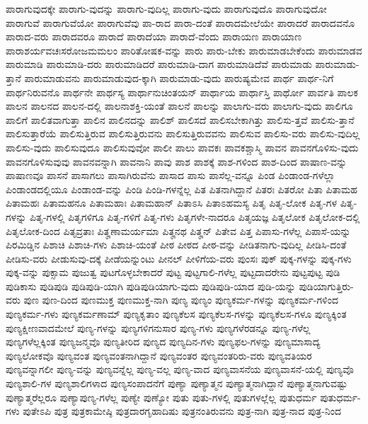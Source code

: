 {ಪಾರಾಗುವುದಕ್ಕೇ
ಪಾರಾಗು-ವುದನ್ನು
ಪಾರಾಗು-ವುದಿಲ್ಲ
ಪಾರಾಗು-ವುದು
ಪಾರಾಗುವುದೊ
ಪಾರಾಗುವುದೋ
ಪಾರಾಗುವೆ
ಪಾರಾಗುವೆಯೋ
ಪಾರಾಗುವೆವು
ಪಾ-ರಾದ
ಪಾರಾ-ದಂತೆ
ಪಾರಾದಮೇಲೆಯೇ
ಪಾರಾದರೆ
ಪಾರಾದವನೊ
ಪಾರಾದ-ವರು
ಪಾರಾದವರೂ
ಪಾರಾದೆ
ಪಾರಾದೆಯಾ
ಪಾರಾದೆ-ವೆಂದು
ಪಾರಾಯಣ
ಪಾರಾಯಾಣ
ಪಾರಾಶರ್ಯವಚಃಸರೋಜಮಮಲಂ
ಪಾರಿತೋಷಕ-ವನ್ನು
ಪಾರು
ಪಾರು-ಬೇಕು
ಪಾರುಮಾಡಬೇಕೆಂದು
ಪಾರುಮಾಡವ
ಪಾರುಮಾಡಿ
ಪಾರುಮಾಡಿ-ದರು
ಪಾರುಮಾಡಿದರೆ
ಪಾರುಮಾಡಿ-ದಾಗ
ಪಾರುಮಾಡಿದೆವೆ
ಪಾರುಮಾಡು
ಪಾರುಮಾಡು-ತ್ತಾನೆ
ಪಾರುಮಾಡುವನು
ಪಾರುಮಾಡುವುದ-ಕ್ಕಾಗಿ
ಪಾರುಮಾಡು-ವುದು
ಪಾರುಷ್ಯಮೇವ
ಪಾರ್ಥ
ಪಾರ್ಥ-ನಿಗೆ
ಪಾರ್ಥನಿರುವನೊ
ಪಾರ್ಥನೇ
ಪಾರ್ಥಸ್ಯ
ಪಾರ್ಥಾನುಚಿಂತಯನ್
ಪಾರ್ಥಾಯ
ಪಾರ್ಥಾಸ್ತಿ
ಪಾರ್ಥೋ
ಪಾರ್ವತಿ
ಪಾಲಕ
ಪಾಲನ
ಪಾಲನದ
ಪಾಲನ-ದಲ್ಲಿ
ಪಾಲನಾಶಕ್ತಿ-ಯಂತೆ
ಪಾಲನೆ
ಪಾಲನ್ನು
ಪಾಲಾಗು-ವರು
ಪಾಲಾಗು-ವುದು
ಪಾಲಿಗೂ
ಪಾಲಿಗೆ
ಪಾಲಿತವಾಗುತ್ತಾ
ಪಾಲಿನ
ಪಾಲಿನದನ್ನು
ಪಾಲಿಶ್
ಪಾಲಿಸದೆ
ಪಾಲಿಸಬೇಕಾಗಿತ್ತು
ಪಾಲಿಸು-ತ್ತವೆ
ಪಾಲಿಸು-ತ್ತಾನೆ
ಪಾಲಿಸುತ್ತಾರೆಯೆ
ಪಾಲಿಸುತ್ತಿರುವ
ಪಾಲಿಸುತ್ತಿರುವನು
ಪಾಲಿಸುತ್ತಿರುವವನು
ಪಾಲಿಸುವ
ಪಾಲಿಸು-ವರು
ಪಾಲಿಸು-ವುದಿಲ್ಲ
ಪಾಲಿಸು-ವುದು
ಪಾಲಿಸುವುದೂ
ಪಾಲಿಸುವುವೋ
ಪಾಲೀ
ಪಾಲು
ಪಾವಕಃ
ಪಾವಕಶ್ಚಾಸ್ಮಿ
ಪಾವನ
ಪಾವನಗೊಳಿಸು-ವುದು
ಪಾವನಗೊಳಿಸುವುವು
ಪಾವನವನ್ನಾಗಿ
ಪಾವನಾನಿ
ಪಾವು
ಪಾಶ
ಪಾಶಕ್ಕೆ
ಪಾಶ-ಗಳಿಂದ
ಪಾಶ-ದಿಂದ
ಪಾಷಾಣ-ವನ್ನು
ಪಾಷಾಣವೂ
ಪಾಸನೆ
ಪಾಸಾಗಲು
ಪಾಸಾಗಿರುವೆನು
ಪಾಸಾದ
ಪಾಸು
ಪಾಸೆಲ್ಲ-ವನ್ನೂ
ಪಿಂಡ
ಪಿಂಡಾಂಡ-ಗಳೆಲ್ಲಾ
ಪಿಂಡಾಂಡದಲ್ಲಿಯೂ
ಪಿಂಡಾಂಡ-ವನ್ನು
ಪಿಂಡಿ
ಪಿಂಡಿ-ಗಳನ್ನೆಲ್ಲ
ಪಿತ
ಪಿತನಾಗಿದ್ದಾನೆ
ಪಿತರಃ
ಪಿತರೋ
ಪಿತಾ
ಪಿತಾಮಹ
ಪಿತಾಮಹಃ
ಪಿತಾಮಹನೂ
ಪಿತಾಮಹಾಃ
ಪಿತಾಮಹಾನ್
ಪಿತಾಽಸಿ
ಪಿತಾಽಹಮಸ್ಯ
ಪಿತೃ
ಪಿತೃ-ಲೋಕ
ಪಿತೃ-ಗಳ
ಪಿತೃ-ಗಳನ್ನು
ಪಿತೃ-ಗಳಲ್ಲಿ
ಪಿತೃಗಳಿಗೂ
ಪಿತೃ-ಗಳಿಗೆ
ಪಿತೃ-ಗಳು
ಪಿತೃಗಳೇ-ನಾದರೂ
ಪಿತೃಯಜ್ಞ
ಪಿತೃಲೋಕ
ಪಿತೃಲೋಕ-ದಲ್ಲಿ
ಪಿತೃಲೋಕ-ದಿಂದ
ಪಿತೃವ್ರತಾಃ
ಪಿತೄಣಾಮರ್ಯಮಾ
ಪಿತೄನಥ
ಪಿತೄನ್
ಪಿತೇವ
ಪಿತ್ತ
ಪಿಪಾಸು-ಗಳೆಲ್ಲ
ಪಿಪಾಸೆ-ಯನ್ನು
ಪಿರಮಿಡ್ಡಿನ
ಪಿಶಾಚಿ
ಪಿಶಾಚಿ-ಗಳು
ಪಿಶಾಚಿ-ಯಂತೆ
ಪೀಠ
ಪೀಠದ
ಪೀಠ-ವನ್ನು
ಪೀಡಿತನಾಗು-ವುದಿಲ್ಲ
ಪೀಡಿಸಿ-ದಂತೆ
ಪೀಡಿಸು-ವರು
ಪೀಡುಸುವು-ದಕ್ಕೆ
ಪೀಡೆಯನ್ನುಂಟು
ಪೀನಲ್
ಪೀಳಿಗೆಯ-ವರು
ಪುಂಸಃ
ಪುಕ್
ಪುಕ್ಕ-ಗಳನ್ನು
ಪುಕ್ಕ-ಗಳು
ಪುಕ್ಕ-ವನ್ನು
ಪುಕ್ಸಾಮ
ಪುಜುತ್ವ
ಪುಟಗೊಳ್ಳಬೇಕಾದರೆ
ಪುಟ್ಟ
ಪುಟ್ಟಗಾಲಿ-ಗಳೆಲ್ಲ
ಪುಟ್ಟದಾದರೇನು
ಪುಟ್ಟಪುಟ್ಟ
ಪುಡಿ
ಪುಡಿಕಾಸು
ಪುಡಿಪುಡಿ
ಪುಡಿಪುಡಿ-ಯಾಗಿ
ಪುಡಿಪುಡಿಯಾಗು-ವುದು
ಪುಡಿಪುಡಿ-ಯಾದ
ಪುಡಿ-ಯನ್ನು
ಪುಡಿಯಾಗುತ್ತಿರು-ವರು
ಪುಣ
ಪುಣ-ದಿಂದ
ಪುಣಮುಕ್ತ
ಪುಣಮುಕ್ತ-ನಾಗಿ
ಪುಣ್ಯ
ಪುಣ್ಯಂ
ಪುಣ್ಯಕರ್ಮ-ಗಳನ್ನು
ಪುಣ್ಯಕರ್ಮ-ಗಳಿಂದ
ಪುಣ್ಯಕರ್ಮ-ಗಳು
ಪುಣ್ಯಕರ್ಮಣಾಮ್
ಪುಣ್ಯಕೃತಾಂ
ಪುಣ್ಯಕೆಲಸ
ಪುಣ್ಯಕೆಲಸ-ಗಳನ್ನು
ಪುಣ್ಯಕೆಲಸ-ಗಳೂ
ಪುಣ್ಯಕ್ಕಿಂತ
ಪುಣ್ಯಕ್ಷೀಣವಾದಮೇಲೆ
ಪುಣ್ಯ-ಗಳನ್ನು
ಪುಣ್ಯಗಳಿಗನುಸಾರ
ಪುಣ್ಯ-ಗಳು
ಪುಣ್ಯಗಳೆರಡನ್ನೂ
ಪುಣ್ಯ-ಗಳೆಲ್ಲ
ಪುಣ್ಯಗಳೆಲ್ಲಕ್ಕಿಂತ
ಪುಣ್ಯಜನ್ಮವೊ
ಪುಣ್ಯತೀರಿದ
ಪುಣ್ಯದ
ಪುಣ್ಯದಿನ-ಗಳು
ಪುಣ್ಯಫಲ-ಗಳನ್ನು
ಪುಣ್ಯಮಾಸಾದ್ಯ
ಪುಣ್ಯಲೋಕವೊ
ಪುಣ್ಯವಂತ
ಪುಣ್ಯವಂತನಾಗಿದ್ದಾನೆ
ಪುಣ್ಯವಂತರ
ಪುಣ್ಯವಂತರಿರು-ವರು
ಪುಣ್ಯವತಿಯರ
ಪುಣ್ಯವನ್ನಾಗಲೀ
ಪುಣ್ಯ-ವನ್ನು
ಪುಣ್ಯವನ್ನೆಲ್ಲ
ಪುಣ್ಯ-ವಲ್ಲ
ಪುಣ್ಯ-ವಾದ
ಪುಣ್ಯವಾಸನೆಯ
ಪುಣ್ಯವಾಸನೆ-ಯಲ್ಲಿ
ಪುಣ್ಯವೊ
ಪುಣ್ಯಶಾಲಿ-ಗಳ
ಪುಣ್ಯಶಾಲಿಗಳಾದ
ಪುಣ್ಯಸಂಪಾದನೆಗೆ
ಪುಣ್ಯಾ
ಪುಣ್ಯಾತ್ಮನ
ಪುಣ್ಯಾತ್ಮನಾಗಿದ್ದಾನೆ
ಪುಣ್ಯಾತ್ಮನಾಗುವಷ್ಟು
ಪುಣ್ಯಾತ್ಮರೆಲ್ಲರೂ
ಪುಣ್ಯಾಪುಣ್ಯ-ಗಳೆಲ್ಲ
ಪುಣ್ಯೇ
ಪುಣ್ಯೋ
ಪುತು
ಪುತು-ಗಳಲ್ಲಿ
ಪುತುಗಳಲ್ಲೆಲ್ಲ
ಪುತುಧರ್ಮ
ಪುತುಧರ್ಮ-ಗಳು
ಪುತೇಽಪಿ
ಪುತ್ರ
ಪುತ್ರಕಾಮೇಷ್ಠಿ
ಪುತ್ರದಾರಗೃಹಾದಿಷು
ಪುತ್ರನಂತಿರುವನು
ಪುತ್ರ-ನಾಗಿ
ಪುತ್ರ-ನಾದ
ಪುತ್ರ-ನಿಂದ
}
